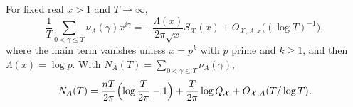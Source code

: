 \begin{theorem}\label{zer:thm:coupledlandau}
For fixed real $x>1$ and $T\to\infty$,
\begin{equation}\label{zer:eq:coupledlandau}
 \frac1T\sum_{0<\gamma\le T}\nu_A(\gamma)x^{i\gamma}=-\frac{\Lambda(x)}{2\pi\sqrt x}S_{\mathcal X}(x)
 +O_{\mathcal X,A,x}\bigl((\log T)^{-1}\bigr),
\end{equation}
where the main term vanishes unless $x=p^k$ with $p$ prime and $k\ge1$, and then $\Lambda(x)=\log p$. With
$N_A(T)=\sum_{0<\gamma\le T}\nu_A(\gamma)$,
\begin{equation}\label{zer:eq:coupledcount}
 N_A(T)=\frac{nT}{2\pi}\Bigl(\log\frac T{2\pi}-1\Bigr)+\frac T{2\pi}\log Q_{\mathcal X}+O_{\mathcal X,A}(T/\log T).
\end{equation}
\end{theorem}
